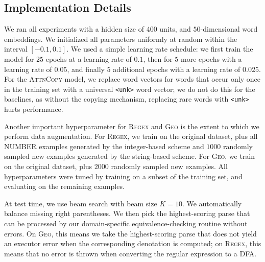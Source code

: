 \documentclass[11pt,letterpaper]{article}
\newcommand{\attncopy}{\textsc{AttnCopy}\xspace}
\newcommand{\regex}{\textsc{Regex}\xspace}
\newcommand{\geo}{\textsc{Geo}\xspace}
\begin{document}
\subsection{Implementation Details}
We ran all experiments with a hidden size of $400$ units,
and $50$-dimensional word embeddings.
We initialized all parameters uniformly at random 
within the interval $[-0.1, 0.1]$.
We used a simple learning rate schedule:
we first train the model for $25$ epochs at a learning rate of $0.1$,
then for $5$ more epochs with a learning rate of $0.05$,
and finally $5$ additional epochs with a learning rate of $0.025$.
For the \attncopy model, we replace word vectors for words
that occur only once in the training set 
with a universal \texttt{<unk>} word vector;
we do not do this for the baselines, as without the copying mechanism,
replacing rare words with \texttt{<unk>} hurts performance.

Another important hyperparameter for \regex and \geo is the
extent to which we perform data augmentation.
For \regex, we train on the original dataset,
plus all NUMBER examples generated by the integer-based scheme
and $1000$ randomly sampled new examples generated by the string-based scheme.
For \geo, we train on the original dataset,
plus $2000$ randomly sampled new examples.
All hyperparameters were tuned by training on a subset of the
training set, and evaluating on the remaining examples.

At test time, we use beam search with beam size $K=10$.
We automatically balance missing right parentheses.
We then pick the highest-scoring parse 
that can be processed by our domain-specific
equivalence-checking routine without errors.
On \geo, this means we take the highest-scoring parse
that does not yield an executor error when the
corresponding denotation is computed;
on \regex, this means that no error is thrown when 
converting the regular expression to a DFA.
\end{document}
